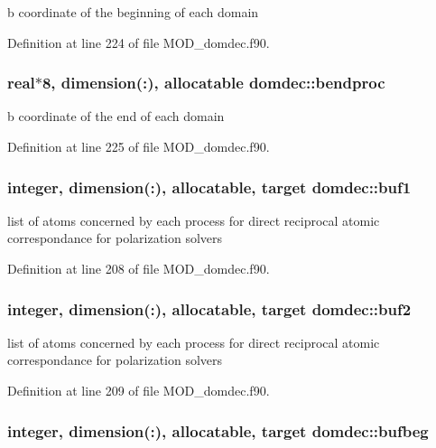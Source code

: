 b coordinate of the beginning of each domain 



Definition at line 224 of file M\-O\-D\-\_\-domdec.\-f90.

\hypertarget{classdomdec_a91b8366b4147ad59a1bb1f2f3ac2b193}{
\subsubsection[{bendproc}]{\setlength{\rightskip}{0pt plus 5cm}real$\ast$8, dimension(\-:), allocatable domdec\-::bendproc}}\label{classdomdec_a91b8366b4147ad59a1bb1f2f3ac2b193}


b coordinate of the end of each domain 



Definition at line 225 of file M\-O\-D\-\_\-domdec.\-f90.

\hypertarget{classdomdec_a7d90558349e9925b91eb336db7059b8d}{
\subsubsection[{buf1}]{\setlength{\rightskip}{0pt plus 5cm}integer, dimension(\-:), allocatable, target domdec\-::buf1}}\label{classdomdec_a7d90558349e9925b91eb336db7059b8d}


list of atoms concerned by each process for direct reciprocal atomic correspondance for polarization solvers 



Definition at line 208 of file M\-O\-D\-\_\-domdec.\-f90.

\hypertarget{classdomdec_a0defed117c2c62aa11dd777d8748b6de}{
\subsubsection[{buf2}]{\setlength{\rightskip}{0pt plus 5cm}integer, dimension(\-:), allocatable, target domdec\-::buf2}}\label{classdomdec_a0defed117c2c62aa11dd777d8748b6de}


list of atoms concerned by each process for direct reciprocal atomic correspondance for polarization solvers 



Definition at line 209 of file M\-O\-D\-\_\-domdec.\-f90.

\hypertarget{classdomdec_ae9894e09bab77f6e5c9bd85833d955b9}{
\subsubsection[{bufbeg}]{\setlength{\rightskip}{0pt plus 5cm}integer, dimension(\-:), allocatable, target domdec\-::bufbeg}}\label{classdomdec_ae9894e09bab77f6e5c9bd85833d955b9}


